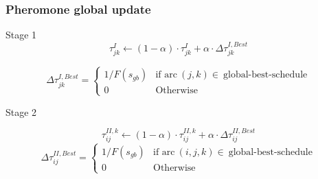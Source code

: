 \begin{frame} \frametitle{Pheromone global update} 

\begin{block} {Stage 1}
\begin{equation} \label{eq:acsTauStage1UpdateGlobal}
\tau_{jk}^{I} \leftarrow (1 - \alpha)\cdot\tau_{jk}^{I} +\alpha\cdot\Delta\tau_{jk}^{I,Best}
\end{equation}

\begin{equation}
\Delta\tau_{jk}^{I,Best} = 
\begin{cases} 
1/F(s_{gb}) & \text{if arc}~(j,k)\in~\text{global-best-schedule} \\
0			& \text{Otherwise}
\end{cases}
\end{equation}

\end{block}

\begin{block}{Stage 2}

\begin{equation} \label{eq:acsTauStage2UpdateGlobal}
\tau_{ij}^{II,k} \leftarrow (1 - \alpha)\cdot\tau_{ij}^{II,k} +\alpha\cdot\Delta\tau_{ij}^{II,Best}
\end{equation}
\begin{equation}
\Delta\tau_{ij}^{II,Best} = 
\begin{cases} 
1/F(s_{gb}) & \text{if arc}~(i,j,k)\in~\text{global-best-schedule} \\
0			& \text{Otherwise}
\end{cases}
\end{equation}
\end{block}


\end{frame}



